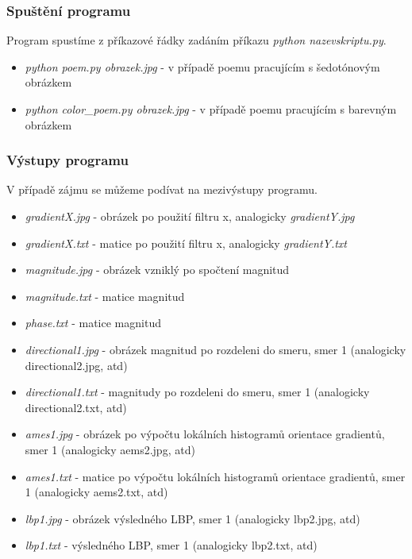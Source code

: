 \documentclass{report}
\begin{document}
\subsubsection{Spuštění programu}
Program spustíme z příkazové řádky zadáním příkazu \textit{python nazevskriptu.py}. 
\begin{itemize}
	\item \textit{python poem.py obrazek.jpg} - v případě poemu pracujícím s šedotónovým obrázkem
	\item \textit{python color\_poem.py obrazek.jpg} - v případě poemu pracujícím s barevným obrázkem
\end{itemize}

\subsubsection{Výstupy programu}
V případě zájmu se můžeme podívat na mezivýstupy programu.
\begin{itemize}
	\item \textit{gradientX.jpg} - obrázek po použití filtru x, analogicky \textit{gradientY.jpg}
	\item \textit{gradientX.txt} - matice po použití filtru x, analogicky \textit{gradientY.txt} 
	\item \textit{magnitude.jpg} - obrázek vzniklý po spočtení magnitud
	\item \textit{magnitude.txt} - matice magnitud 
	\item \textit{phase.txt} - matice magnitud 
	\item \textit{directional1.jpg} - obrázek magnitud po rozdeleni do smeru, smer 1 (analogicky directional2.jpg, atd)
	\item \textit{directional1.txt} - magnitudy po rozdeleni do smeru, smer 1 (analogicky directional2.txt, atd)
	\item \textit{ames1.jpg} - obrázek po výpočtu lokálních histogramů orientace gradientů, smer 1 (analogicky aems2.jpg, atd)
	\item \textit{ames1.txt} - matice po výpočtu lokálních histogramů orientace gradientů, smer 1 (analogicky aems2.txt, atd)
	\item \textit{lbp1.jpg} - obrázek výsledného LBP, smer 1 (analogicky lbp2.jpg, atd)
	\item \textit{lbp1.txt} - výsledného LBP, smer 1 (analogicky lbp2.txt, atd)
\end{itemize}


\end{document}
